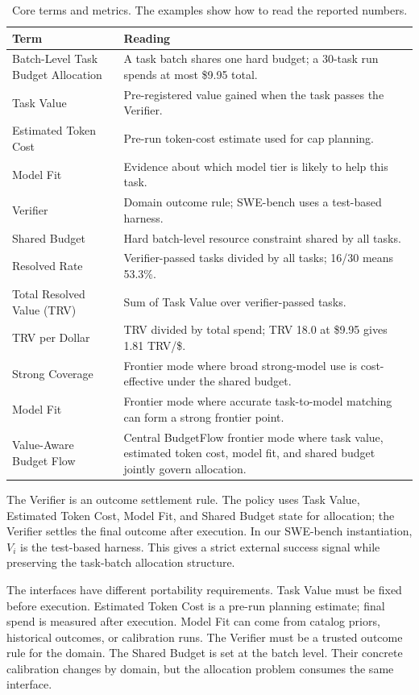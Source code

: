 \documentclass{article}
\newcommand{\method}{BudgetFlow\xspace}
\newcommand{\trv}{TRV\xspace}
\newcommand{\taskvalue}{Task Value\xspace}
\newcommand{\tokencost}{Estimated Token Cost\xspace}
\newcommand{\modelfit}{Model Fit\xspace}
\newcommand{\sharedbudget}{Shared Budget\xspace}
\newcommand{\verifier}{Verifier\xspace}
\begin{document}
\begin{table}[H]
\centering
\footnotesize
\begin{tabular}{@{}p{}p{}@{}}
\toprule
Term & Reading \\
\midrule
Batch-Level Task Budget Allocation & A task batch shares one hard budget; a 30-task run spends at most \$9.95 total. \\
\taskvalue & Pre-registered value gained when the task passes the \verifier. \\
\tokencost & Pre-run token-cost estimate used for cap planning. \\
\modelfit & Evidence about which model tier is likely to help this task. \\
\verifier & Domain outcome rule; SWE-bench uses a test-based harness. \\
\sharedbudget & Hard batch-level resource constraint shared by all tasks. \\
Resolved Rate & Verifier-passed tasks divided by all tasks; 16/30 means 53.3\%. \\
Total Resolved Value (\trv) & Sum of \taskvalue over verifier-passed tasks. \\
\trv per Dollar & \trv divided by total spend; \trv 18.0 at \$9.95 gives 1.81 \trv/\$. \\
Strong Coverage & Frontier mode where broad strong-model use is cost-effective under the shared budget. \\
Model Fit & Frontier mode where accurate task-to-model matching can form a strong frontier point. \\
Value-Aware Budget Flow & Central \method frontier mode where task value, estimated token cost, model fit, and shared budget jointly govern allocation. \\
\bottomrule
\end{tabular}
\caption{Core terms and metrics. The examples show how to read the reported numbers.}
\label{tab:glossary}
\end{table}

The \verifier is an outcome settlement rule. The policy uses \taskvalue, \tokencost, \modelfit, and \sharedbudget state for allocation; the \verifier settles the final outcome after execution. In our SWE-bench instantiation, $V_i$ is the test-based harness. This gives a strict external success signal while preserving the task-batch allocation structure.

The interfaces have different portability requirements. \taskvalue must be fixed before execution. \tokencost is a pre-run planning estimate; final spend is measured after execution. \modelfit can come from catalog priors, historical outcomes, or calibration runs. The \verifier must be a trusted outcome rule for the domain. The \sharedbudget is set at the batch level. Their concrete calibration changes by domain, but the allocation problem consumes the same interface.
\end{document}
